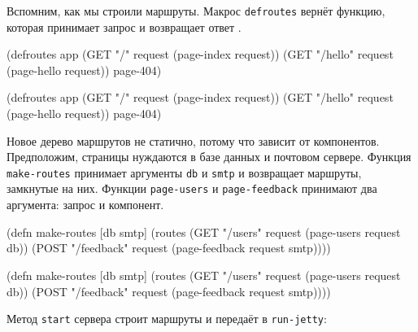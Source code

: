 
Вспомним, как мы строили маршруты. Макрос \verb|defroutes| вернёт функцию,
которая принимает запрос и возвращает ответ .

\ifx\DEVICETYPE\MOBILE

\begin{english}
  \begin{clojure}
(defroutes app
  (GET "/"
    request (page-index request))
  (GET "/hello"
    request (page-hello request))
  page-404)
  \end{clojure}
\end{english}

\else

\begin{english}
  \begin{clojure}
(defroutes app
  (GET "/"      request (page-index request))
  (GET "/hello" request (page-hello request))
  page-404)
  \end{clojure}
\end{english}

\fi

Новое дерево маршрутов не статично, потому что зависит от компонентов.
Предположим, страницы нуждаются в базе данных и почтовом сервере.  Функция
\verb|make-routes| принимает аргументы \verb|db| и \verb|smtp| и возвращает
маршруты, замкнутые на них. Функции \verb|page-users| и \verb|page-feedback|
принимают два аргумента: запрос и компонент.

\ifx\DEVICETYPE\MOBILE

\begin{english}
  \begin{clojure}
(defn make-routes [db smtp]
  (routes
   (GET "/users" request
      (page-users request db))
   (POST "/feedback" request
      (page-feedback request smtp))))
  \end{clojure}
\end{english}

\else

\begin{english}
  \begin{clojure}
(defn make-routes [db smtp]
  (routes
   (GET "/users" request (page-users request db))
   (POST "/feedback" request (page-feedback request smtp))))
  \end{clojure}
\end{english}

\fi

\noindent
Метод \verb|start| сервера строит маршруты и передаёт в \verb|run-jetty|:

